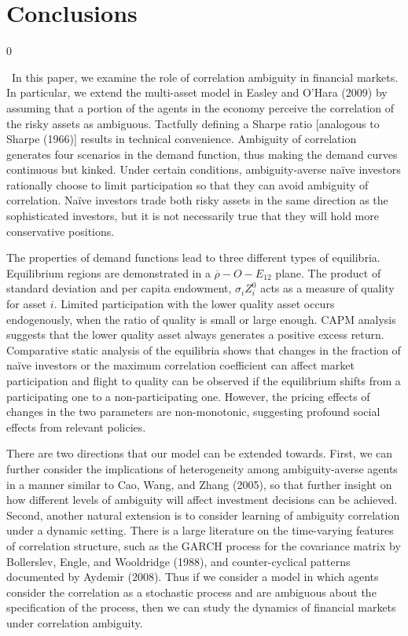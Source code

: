 \documentclass[10pt]{article}
\begin{document}
\section{Conclusions}
\renewcommand{\theequation}{5.\arabic{equation}}
\setcounter{equation}0

\quad \ 
In this paper, we examine the role of correlation ambiguity in financial markets. In particular, we extend the multi-asset model in Easley and O'Hara (2009) by assuming that a portion of the agents in the economy perceive the correlation of the risky assets as ambiguous. Tactfully defining a Sharpe ratio [analogous to Sharpe (1966)] results in technical convenience. Ambiguity of correlation generates four scenarios in the demand function, thus making the demand curves continuous but kinked. Under certain conditions, ambiguity-averse na\"ive investors rationally choose to limit participation so that they can avoid ambiguity of correlation. Na\"ive investors trade both risky assets in the same direction as the sophisticated investors, but it is not necessarily true that they will hold more conservative positions. 

The properties of demand functions lead to three different types of equilibria. Equilibrium regions are demonstrated in a $ \overline{\rho} - O - E_{12} $ plane. The product of standard deviation and per capita endowment, $ \sigma_i Z_i^0 $ acts as a measure of quality for asset $i$. Limited participation with the lower quality asset occurs endogenously, when the ratio of quality is small or large enough. CAPM analysis suggests that the lower quality asset always generates a positive excess return. Comparative static analysis of the equilibria shows that changes in the fraction of na\"ive investors or the maximum correlation coefficient can affect market participation and flight to quality can be observed if the equilibrium shifts from a participating one to a non-participating one. However, the pricing effects of changes in the two parameters are non-monotonic, suggesting profound social effects from relevant policies.

There are two directions that our model can be extended towards. First, we can further consider the implications of heterogeneity among ambiguity-averse agents in a manner similar to Cao, Wang, and Zhang (2005), so that further insight on how different levels of ambiguity will affect investment decisions can be achieved. Second, another natural extension is to consider learning of ambiguity correlation under a dynamic setting. There is a large literature on the time-varying features of correlation structure, such as the GARCH process for the covariance matrix by Bollerslev, Engle, and Wooldridge (1988), and counter-cyclical patterns documented by Aydemir (2008). Thus if we consider a model in which agents consider the correlation as a stochastic process and are ambiguous about the specification of the process, then we can study the dynamics of financial markets under correlation ambiguity. 
\end{document}
